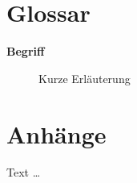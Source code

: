 {}
\chapter*{Glossar}
\begin{comment}
Unterschiedliche Disziplinen verwenden z. T. die selben Begriffe für unterschiedliche Sachverhalte und unterschiedliche Begriffe für die selben Sachverhalte. Hier können Sie wiederkehrende zentrale Begriffe der Arbeit kurz definieren (z. B. Adipositas, Depression, Legasthenie, etc.). Früher wichtiger, dann konnte man hierhin blättern und musste nicht den ganzen Text absuchen. Heute verwendet man digital die Suchfunktion. Trotzdem ernst nehmen.
\end{comment}

\begin{description}
    \item [\textbf{Begriff}] Kurze Erläuterung
\end{description}
\clearpage

{}
\chapter*{Anhänge}
\begin{comment}
Zusätzliche Informationen die zu lang für die Arbeit sind können hier verfügbar gemacht werden.

Aber auch an die DVD denken — was ist dort besser aufgehoben? Die Zeiten, in denen man Programmcode manuell eingetippt hat, sind ja glücklicherweise lange vorbei, deswegen macht Code hier wenig Sinn.

Ist entsprechend ein Priorisierung: Was würde sich der Leser vielleicht gerne während des Lesens der Arbeit (z. B. im Zug) ansehen, wenn er auch gerade nicht auf die DVD zugreifen kann (kein DVD Laufwerk)?

Inhalte sind oft: Überblick der Inhalte der DVD, Fragebögen (falls digital Screenshots oder neu für den Druck formatiert), Interviewleitfäden, etc. Selten detailliertere Evaluationsergebnisse.

Hier kurz die Zwischenüberschriften nennen und evtl. 1 Satz, was dort zu finden ist (falls es nicht schon durch die Zwischenüberschrift klar ist). 
\end{comment}

Text \dots

{}
